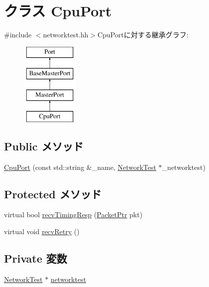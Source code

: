 \hypertarget{classNetworkTest_1_1CpuPort}{
\section{クラス CpuPort}
\label{classNetworkTest_1_1CpuPort}
}


{\ttfamily \#include $<$networktest.hh$>$}CpuPortに対する継承グラフ:\begin{figure}[H]
\begin{center}
\leavevmode
\includegraphics[height=4cm]{classNetworkTest_1_1CpuPort}
\end{center}
\end{figure}
\subsection*{Public メソッド}
\begin{DoxyCompactItemize}
\item 
\hyperlink{classNetworkTest_1_1CpuPort_abf09ddb6b9a4ab46cbada0e219ae2617}{CpuPort} (const std::string \&\_\-name, \hyperlink{classNetworkTest_1_1NetworkTest}{NetworkTest} $\ast$\_\-networktest)
\end{DoxyCompactItemize}
\subsection*{Protected メソッド}
\begin{DoxyCompactItemize}
\item 
virtual bool \hyperlink{classNetworkTest_1_1CpuPort_a482dba5588f4bee43e498875a61e5e0b}{recvTimingResp} (\hyperlink{classPacket}{PacketPtr} pkt)
\item 
virtual void \hyperlink{classNetworkTest_1_1CpuPort_a29cb5a4f98063ce6e9210eacbdb35298}{recvRetry} ()
\end{DoxyCompactItemize}
\subsection*{Private 変数}
\begin{DoxyCompactItemize}
\item 
\hyperlink{classNetworkTest_1_1NetworkTest}{NetworkTest} $\ast$ \hyperlink{classNetworkTest_1_1CpuPort_a72fd9e77dfa99f96f0972fe6c91e4543}{networktest}
\end{DoxyCompactItemize}


